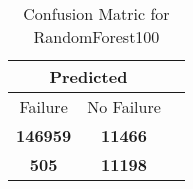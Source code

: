 \begin{table}[] 
\caption{Confusion Matric for RandomForest100} 
\label{Table: Prediction Accuracy-NoneRandomForest100SVMEKF-ignoreReflection100.9EKF-top2-Reflection} 
\centering 
\begin{tabular} 
 {@{}ccc@{}} 
\toprule 
\multicolumn{2}{c}{\textbf{Predicted}}
 \\ \midrule 
\multicolumn{1}{|c|}{Failure} & 
\multicolumn{1}{c|}{No Failure}
 \\ \midrule 
\multicolumn{1}{|c|}{\color{green}\textbf{146959}} & 
\multicolumn{1}{c|}{\color{green}\textbf{11466}}
 \\ \midrule 
\multicolumn{1}{|c|}{\color{red}\textbf{505}} & 
\multicolumn{1}{c|}{\color{red}\textbf{11198}}
 \\ \bottomrule 
\end{tabular} 
\end{table} 
